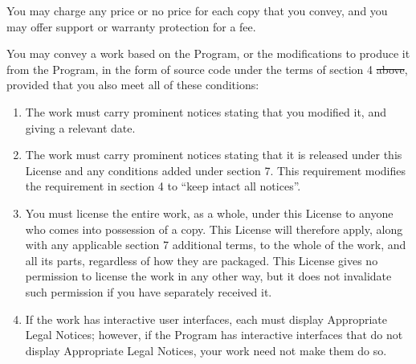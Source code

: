 \documentclass[11pt]{article}
\newcounter{v2section}
\newcounter{v3section}
\begin{document}
  You may charge any price or no price for each copy that you convey,
and you may offer support or warranty protection for a fee.


 You may convey a work based on the Program, or the modifications to
produce it from the Program, in the form of source code under the terms
of section 4 \sout{above}, provided that you also meet all of these
conditions:

\renewcommand{\labelenumi}{\alph{enumi})}
\begin{enumerate}

\item

    The work must carry prominent notices stating that you modified it,
    and giving a relevant date.

\item 

    The work must carry prominent notices stating that it is released
    under this License and any conditions added under section 7.  This
    requirement modifies the requirement in section 4 to ``keep intact
    all notices''.

\item

    You must license the entire work, as a whole, under this License
    to anyone who comes into possession of a copy.  This License will
    therefore apply, along with any applicable section 7 additional
    terms, to the whole of the work, and all its parts, regardless of
    how they are packaged.  This License gives no permission to license
    the work in any other way, but it does not invalidate such
    permission if you have separately received it.

\item

    If the work has interactive user interfaces, each must display
    Appropriate Legal Notices; however, if the Program has interactive
    interfaces that do not display Appropriate Legal Notices, your work
    need not make them do so.

\end{enumerate}
 
\end{document}

